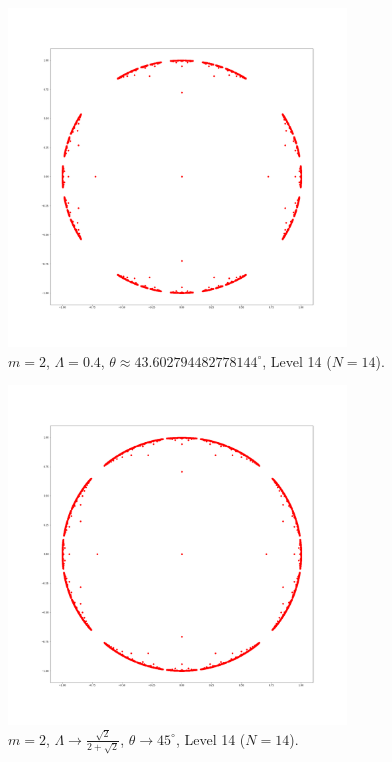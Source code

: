 \documentclass[12pt,oneside]{sfsuthesis}
\theoremstyle{plain} %
\theoremstyle{definition}  %
\theoremstyle{remark}  %
\theoremstyle{plain}
\begin{document}
{\begin{figure}[H]
\centering
\includegraphics[width=0.8\textwidth]{Lambda=0.4,m=2,N=14.png}
\caption{$m=2$, $\Lambda=0.4$, $\theta\approx 43.602794482778144^{\circ}$, Level 14 ($N=14$).}
\end{figure}

\begin{figure}[H]
\centering
\includegraphics[width=0.8\textwidth]{Lambda=r,m=2,N=14.png}
\caption{$m=2$, $\Lambda\to\frac{\sqrt{2}}{2+\sqrt{2}}$, $\theta\to 45^{\circ}$, Level 14 ($N=14$).}
\end{figure}
 
}
\end{document}
